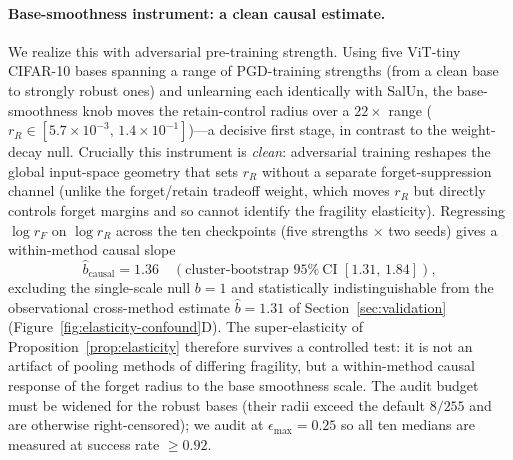 \paragraph{Base-smoothness instrument: a clean causal estimate.} We realize this
with adversarial pre-training strength. Using five ViT-tiny CIFAR-10 bases
spanning a range of PGD-training strengths (from a clean base to strongly robust
ones) and unlearning each identically with SalUn, the base-smoothness knob moves
the retain-control radius over a $22\times$ range
($r_R \in [5.7\times10^{-3},\,1.4\times10^{-1}]$)---a decisive first stage, in
contrast to the weight-decay null. Crucially this instrument is \emph{clean}:
adversarial training reshapes the global input-space geometry that sets $r_R$
without a separate forget-suppression channel (unlike the forget/retain tradeoff
weight, which moves $r_R$ but directly controls forget margins and so cannot
identify the fragility elasticity). Regressing $\log r_F$ on $\log r_R$ across the
ten checkpoints (five strengths $\times$ two seeds) gives a within-method causal
slope
\[
  \hat b_{\text{causal}} = 1.36 \quad (\text{cluster-bootstrap } 95\%\ \text{CI } [1.31,\,1.84]),
\]
excluding the single-scale null $b=1$ and statistically indistinguishable from
the observational cross-method estimate $\hat b = 1.31$ of
Section~\ref{sec:validation} (Figure~\ref{fig:elasticity-confound}D). The
super-elasticity of Proposition~\ref{prop:elasticity} therefore survives a
controlled test: it is not an artifact of pooling methods of differing fragility,
but a within-method causal response of the forget radius to the base smoothness
scale. The audit budget must be widened for the robust bases (their radii exceed
the default $8/255$ and are otherwise right-censored); we audit at
$\epsilon_{\max}=0.25$ so all ten medians are measured at success rate $\ge 0.92$.
